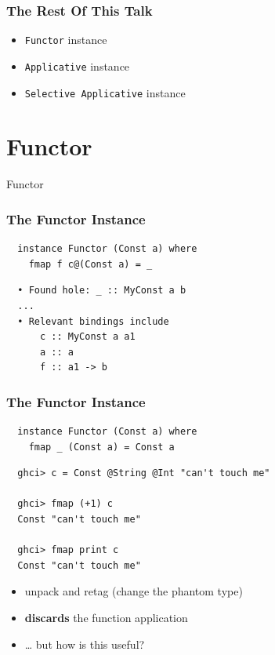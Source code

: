 \documentclass[aspectratio=169]{beamer}
\begin{document}
\begin{frame}
  \frametitle{The Rest Of This Talk}
  \begin{itemize}
  \item \texttt{Functor} instance
  \item \texttt{Applicative} instance
  \item \texttt{Selective Applicative} instance
  \end{itemize}
\end{frame}

\section{Functor}
\begin{frame}
  \begin{center}
    \Huge Functor
  \end{center}
\end{frame}

\begin{frame}[fragile,t]
  \frametitle{The Functor Instance}
  \begin{verbatim}
  instance Functor (Const a) where
    fmap f c@(Const a) = _
  \end{verbatim}
  \vspace{5mm}
  \begin{verbatim}
  • Found hole: _ :: MyConst a b
  ...
  • Relevant bindings include
      c :: MyConst a a1
      a :: a
      f :: a1 -> b
  \end{verbatim}
\end{frame}

\begin{frame}[fragile,t]
  \frametitle{The Functor Instance}
  \begin{verbatim}
  instance Functor (Const a) where
    fmap _ (Const a) = Const a
  \end{verbatim}
  \vspace{5mm}
  \begin{verbatim}
  ghci> c = Const @String @Int "can't touch me"

  ghci> fmap (+1) c
  Const "can't touch me"

  ghci> fmap print c
  Const "can't touch me"
  \end{verbatim}
  \vfill
  \begin{itemize}
  \item unpack and retag (change the phantom type)
  \item \textbf{discards} the function application
  \item \dots{} but how is this useful?
  \end{itemize}
\end{frame}
\end{document}
